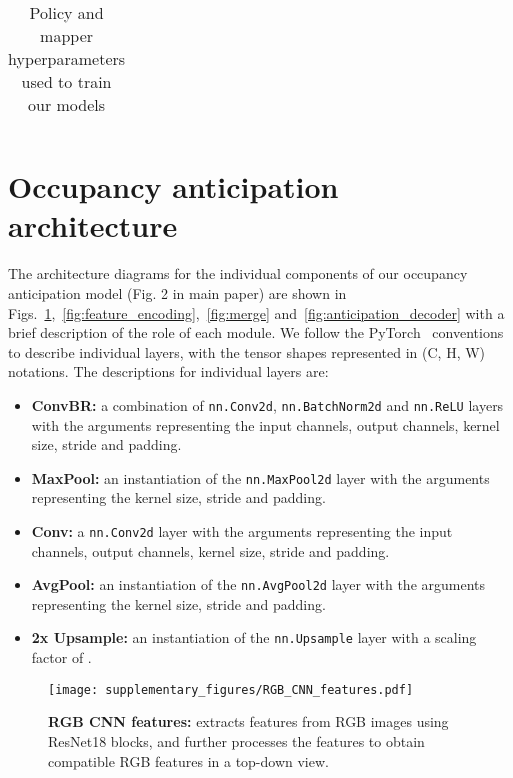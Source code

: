\documentclass[runningheads]{llncs}
\newcommand{\code}[1]{\texttt{\small #1}}
\begin{document}
\begin{table}[ht!]
\begin{tabular}{@{}ll@{}}
\bottomrule
\end{tabular}
\caption{Policy and mapper hyperparameters used to train our models}
\label{tab:hyperparameters}
\end{table}


\section{Occupancy anticipation architecture}
\label{sec:occupancy_anticipation_architecture}
The architecture diagrams for the individual components of our occupancy anticipation model (Fig. 2 in main paper) are shown in Figs.~\ref{fig:rgb_cnn_features},~\ref{fig:feature_encoding},~\ref{fig:merge} and~\ref{fig:anticipation_decoder} with a brief description of the role of each module. We follow the PyTorch~\cite{NEURIPS2019_9015} conventions to describe individual layers, with the tensor shapes represented in (C, H, W) notations. The descriptions for individual layers are:

\begin{itemize}
    \item \textbf{ConvBR:} a combination of \code{nn.Conv2d}, \code{nn.BatchNorm2d} and \code{nn.ReLU} layers with the arguments representing the input channels, output channels, kernel size, stride and padding.
    \item \textbf{MaxPool:} an instantiation of the \code{nn.MaxPool2d} layer with the arguments representing the kernel size, stride and padding.
    \item \textbf{Conv:} a \code{nn.Conv2d} layer with the arguments representing the input channels, output channels, kernel size, stride and padding.
    \item \textbf{AvgPool:} an instantiation of the \code{nn.AvgPool2d} layer with the arguments representing the kernel size, stride and padding.
    \item \textbf{2x Upsample:} an instantiation of the \code{nn.Upsample} layer with a scaling factor of .
\end{itemize}

\begin{figure}[ht!]
    \centering
    \texttt{[image: supplementary\_figures/RGB\_CNN\_features.pdf]}
    \caption{\small\textbf{RGB CNN features:} extracts features from RGB images using ResNet18 blocks, and further processes the features to obtain compatible RGB features in a top-down view.}
    \label{fig:rgb_cnn_features}
\end{figure}
\end{document}
